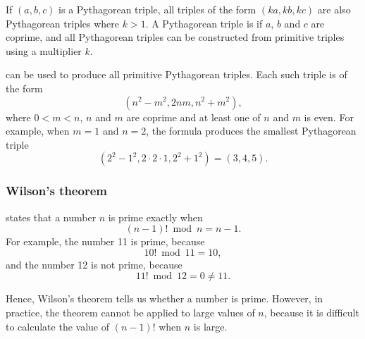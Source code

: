 If $(a,b,c)$ is a Pythagorean triple,
all triples of the form $(ka,kb,kc)$
are also Pythagorean triples where $k>1$.
A Pythagorean triple is  if
$a$, $b$ and $c$ are coprime,
and all Pythagorean triples can be constructed
from primitive triples using a multiplier $k$.

 can be used to produce
all primitive Pythagorean triples.
Each such triple is of the form
\[(n^2-m^2,2nm,n^2+m^2),\]
where $0<m<n$, $n$ and $m$ are coprime
and at least one of $n$ and $m$ is even.
For example, when $m=1$ and $n=2$, the formula
produces the smallest Pythagorean triple
\[(2^2-1^2,2\cdot2\cdot1,2^2+1^2)=(3,4,5).\]

\subsubsection{Wilson's theorem}


 states that a number $n$
is prime exactly when
\[(n-1)! \bmod n = n-1.\]
For example, the number 11 is prime, because
\[10! \bmod 11 = 10,\]
and the number 12 is not prime, because
\[11! \bmod 12 = 0 \neq 11.\]

Hence, Wilson's theorem tells us whether a number
is prime. However, in practice, the theorem cannot be
applied to large values of $n$, because it is difficult
to calculate the value of $(n-1)!$ when $n$ is large.


